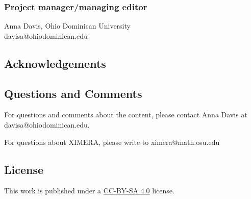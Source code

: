 \documentclass{ximera}
\begin{document}
\subsubsection*{Project manager/managing editor}
Anna Davis, Ohio Dominican University\\
davisa@ohiodominican.edu



\subsection*{Acknowledgements}

\subsection*{Questions and Comments}
For questions and comments about the content, please contact Anna Davis at davisa@ohiodominican.edu.

For questions about XIMERA, please write to ximera@math.osu.edu

\subsection*{License}
This work is published under a \href{https://creativecommons.org/licenses/by-sa/4.0/deed.en}{CC-BY-SA 4.0} license.
\end{document}
